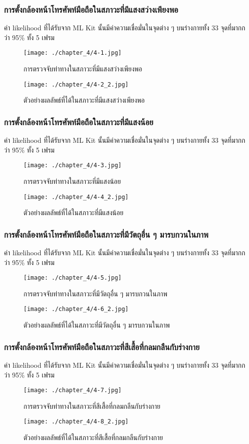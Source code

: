 \subsubsection{การตั้งกล้องหน้าโทรศัพท์มือถือในสภาวะที่มีแสงสว่างเพียงพอ}
ค่า likelihood ที่ได้รับจาก ML Kit นั้นมีค่าความเชื่อมั่นในจุดต่าง ๆ บนร่างกายทั้ง 33 จุดที่มากกว่า 95\% ทั้ง 5 เฟรม
\begin{figure}
	\texttt{[image: ./chapter\_4/4-1.jpg]}
	\caption{การตรวจจับท่าทางในสภาวะที่มีแสงสว่างเพียงพอ}
\end{figure}
\begin{figure}
	\texttt{[image: ./chapter\_4/4-2\_2.jpg]}
	\caption{ตัวอย่างผลลัพธ์ที่ได้ในสภาวะที่มีแสงสว่างเพียงพอ}
\end{figure}
\subsubsection{การตั้งกล้องหน้าโทรศัพท์มือถือในสภาวะที่มีแสงน้อย}
ค่า likelihood ที่ได้รับจาก ML Kit นั้นมีค่าความเชื่อมั่นในจุดต่าง ๆ บนร่างกายทั้ง 33 จุดที่มากกว่า 95\% ทั้ง 5 เฟรม
\begin{figure}
	\texttt{[image: ./chapter\_4/4-3.jpg]}
	\caption{การตรวจจับท่าทางในสภาวะที่มีแสงน้อย}
\end{figure}
\begin{figure}
	\texttt{[image: ./chapter\_4/4-4\_2.jpg]}
	\caption{ตัวอย่างผลลัพธ์ที่ได้ในสภาวะที่มีแสงน้อย}
\end{figure}
\subsubsection{การตั้งกล้องหน้าโทรศัพท์มือถือในสภาวะที่มีวัตถุอื่น ๆ มารบกวนในภาพ}
ค่า likelihood ที่ได้รับจาก ML Kit นั้นมีค่าความเชื่อมั่นในจุดต่าง ๆ บนร่างกายทั้ง 33 จุดที่มากกว่า 95\% ทั้ง 5 เฟรม
\begin{figure}
	\texttt{[image: ./chapter\_4/4-5.jpg]}
	\caption{การตรวจจับท่าทางในสภาวะที่มีวัตถุอื่น ๆ มารบกวนในภาพ}
\end{figure}
\begin{figure}
	\texttt{[image: ./chapter\_4/4-6\_2.jpg]}
	\caption{ตัวอย่างผลลัพธ์ที่ได้ในสภาวะที่มีวัตถุอื่น ๆ มารบกวนในภาพ}
\end{figure}
\subsubsection{การตั้งกล้องหน้าโทรศัพท์มือถือในสภาวะที่สีเสื้อที่กลมกลืนกับร่างกาย}
ค่า likelihood ที่ได้รับจาก ML Kit นั้นมีค่าความเชื่อมั่นในจุดต่าง ๆ บนร่างกายทั้ง 33 จุดที่มากกว่า 95\% ทั้ง 5 เฟรม
\begin{figure}
	\texttt{[image: ./chapter\_4/4-7.jpg]}
	\caption{การตรวจจับท่าทางในสภาวะที่สีเสื้อที่กลมกลืนกับร่างกาย}
\end{figure}
\begin{figure}
	\texttt{[image: ./chapter\_4/4-8\_2.jpg]}
	\caption{ตัวอย่างผลลัพธ์ที่ได้ในสภาวะที่สีเสื้อที่กลมกลืนกับร่างกาย}
\end{figure}
